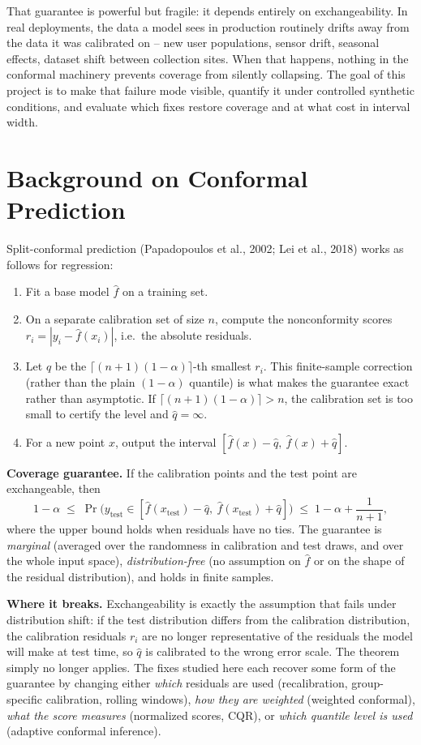\documentclass[11pt]{article}
\begin{document}
That guarantee is powerful but fragile: it depends entirely on exchangeability. In
real deployments, the data a model sees in production routinely drifts away from
the data it was calibrated on -- new user populations, sensor drift, seasonal
effects, dataset shift between collection sites. When that happens, nothing in the
conformal machinery prevents coverage from silently collapsing. The goal of this
project is to make that failure mode visible, quantify it under controlled synthetic
conditions, and evaluate which fixes restore coverage and at what cost in interval
width.

\section{Background on Conformal Prediction}

Split-conformal prediction (Papadopoulos et al., 2002; Lei et al., 2018) works as
follows for regression:

\begin{enumerate}
  \item Fit a base model $\hat f$ on a training set.
  \item On a separate calibration set of size $n$, compute the nonconformity scores
    $r_i = |y_i - \hat f(x_i)|$, i.e.\ the absolute residuals.
  \item Let $\hat q$ be the $\lceil (n+1)(1-\alpha) \rceil$-th smallest $r_i$. This
    finite-sample correction (rather than the plain $(1-\alpha)$ quantile) is what
    makes the guarantee exact rather than asymptotic. If
    $\lceil (n+1)(1-\alpha) \rceil > n$, the calibration set is too small to certify
    the level and $\hat q = \infty$.
  \item For a new point $x$, output the interval $[\hat f(x) - \hat q,\ \hat f(x) +
    \hat q]$.
\end{enumerate}

\textbf{Coverage guarantee.} If the calibration points and the test point are
exchangeable, then
\[
  1-\alpha \;\le\; \Pr\big(y_{\text{test}} \in [\hat f(x_{\text{test}}) - \hat q,\ \hat f(x_{\text{test}}) + \hat q]\big) \;\le\; 1-\alpha + \frac{1}{n+1},
\]
where the upper bound holds when residuals have no ties. The guarantee is
\emph{marginal} (averaged over the randomness in calibration and test draws, and over
the whole input space), \emph{distribution-free} (no assumption on $\hat f$ or on the
shape of the residual distribution), and holds in finite samples.

\textbf{Where it breaks.} Exchangeability is exactly the assumption that fails under
distribution shift: if the test distribution differs from the calibration
distribution, the calibration residuals $r_i$ are no longer representative of the
residuals the model will make at test time, so $\hat q$ is calibrated to the wrong
error scale. The theorem simply no longer applies. The fixes studied here each recover
some form of the guarantee by changing either \emph{which} residuals are used
(recalibration, group-specific calibration, rolling windows), \emph{how they are
weighted} (weighted conformal), \emph{what the score measures} (normalized scores,
CQR), or \emph{which quantile level is used} (adaptive conformal inference).
\end{document}
